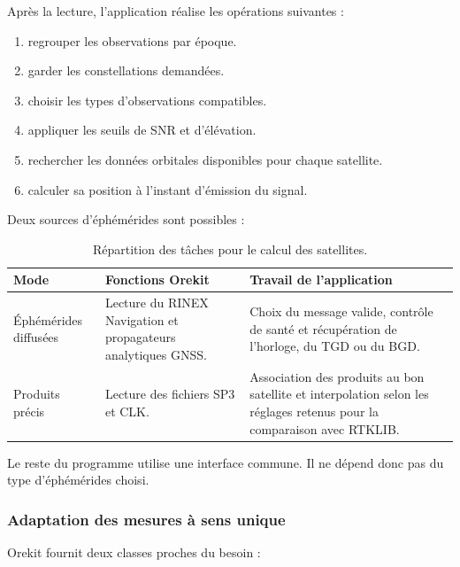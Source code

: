 Après la lecture, l'application réalise les opérations suivantes :

\begin{enumerate}
    \item regrouper les observations par époque.
    \item garder les constellations demandées.
    \item choisir les types d'observations compatibles.
    \item appliquer les seuils de SNR et d'élévation.
    \item rechercher les données orbitales disponibles pour chaque satellite.
    \item calculer sa position à l'instant d'émission du signal.
\end{enumerate}

Deux sources d'éphémérides sont possibles :

\begin{table}[htbp]
\centering
\small
\begin{tabularx}{\textwidth}{|>{\raggedright\arraybackslash}p{}|
                                  >{\raggedright\arraybackslash}p{}|
                                  >{\raggedright\arraybackslash}X|}
\hline
\textbf{Mode} & \textbf{Fonctions Orekit} & \textbf{Travail de l'application} \\
\hline
Éphémérides diffusées & Lecture du RINEX Navigation et propagateurs analytiques
GNSS. & Choix du message valide, contrôle de santé et récupération de
l'horloge, du TGD ou du BGD. \\
\hline
Produits précis & Lecture des fichiers SP3 et CLK. & Association des produits
au bon satellite et interpolation selon les réglages retenus pour la
comparaison avec RTKLIB. \\
\hline
\end{tabularx}
\caption{Répartition des tâches pour le calcul des satellites.}
\label{tab:orekit_satellite_reuse}
\end{table}

Le reste du programme utilise une interface commune. Il ne dépend donc pas du
type d'éphémérides choisi.

\subsubsection{Adaptation des mesures à sens unique}

Orekit fournit deux classes proches du besoin :

